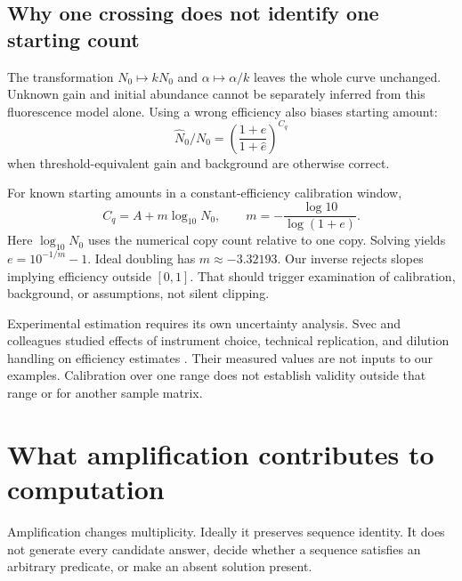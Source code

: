 \begin{center}\end{center}

\subsection{Why one crossing does not identify one starting count}
The transformation $N_0\mapsto kN_0$ and $\alpha\mapsto\alpha/k$ leaves the whole curve unchanged. Unknown gain and initial abundance cannot be separately inferred from this fluorescence model alone. Using a wrong efficiency also biases starting amount:
\begin{equation}
\widehat N_0/N_0
=\left(\frac{1+e}{1+\widehat e}\right)^{C_q}
\end{equation}
when threshold-equivalent gain and background are otherwise correct.

For known starting amounts in a constant-efficiency calibration window,
\begin{equation}
C_q=A+m\log_{10}N_0,\qquad
m=-\frac{\log 10}{\log(1+e)}.
\end{equation}
Here $\log_{10}N_0$ uses the numerical copy count relative to one copy. Solving yields $e=10^{-1/m}-1$. Ideal doubling has $m\approx-3.32193$. Our inverse rejects slopes implying efficiency outside $[0,1]$. That should trigger examination of calibration, background, or assumptions, not silent clipping.

Experimental estimation requires its own uncertainty analysis. Svec and colleagues studied effects of instrument choice, technical replication, and dilution handling on efficiency estimates \cite{svec}. Their measured values are not inputs to our examples. Calibration over one range does not establish validity outside that range or for another sample matrix.

\section{What amplification contributes to computation}
Amplification changes multiplicity. Ideally it preserves sequence identity. It does not generate every candidate answer, decide whether a sequence satisfies an arbitrary predicate, or make an absent solution present.


